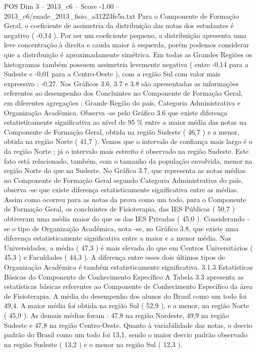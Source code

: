 \begin{textsample}{POS Dim 3 – 2013\_c6 – Score -1.00 – 2013\_c6/enade\_2013\_fisio\_a31223fe5a.txt}
Para o Componente de Formação Geral, o coeficiente de assimetria da distribuição das notas dos estudantes é negativo ( -0,14 ).
Por ser um coeficiente pequeno, a distribuição apresenta uma leve concentração à direita e cauda maior à esquerda, porém podemos considerar que a distribuição é aproximadamente simétrica.
Em todas as Grandes Regiões os histogramas também possuem assimetria levemente negativa ( entre -0,14 para a Sudeste e -0,01 para a Centro-Oeste ), com a região Sul com valor mais expressivo : -0,27.
Nos Gráficos 3.6, 3.7 e 3.8 são apresentadas as informações referentes ao desempenho dos Concluintes no Componente de Formação Geral, em diferentes agregações : Grande Região do país, Categoria Administrativa e Organização Acadêmica.
Observa -se pelo Gráfico 3.6 que existe diferença estatisticamente significativa ao nível de 95 \% entre a maior média das notas na Componente de Formação Geral, obtida na região Sudeste ( 46,7 ) e a menor, obtida na região Norte ( 41,7 ).
Vemos que o intervalo de confiança mais largo é o da região Norte ; já o intervalo mais estreito é observado na região Sudeste.
Este fato está relacionado, também, com o tamanho da população envolvida, menor na região Norte do que na Sudeste.
No Gráfico 3.7, que representa as notas médias no Componente de Formação Geral segundo Categoria Administrativa do país, observa -se que existe diferença estatisticamente significativa entre as médias.
Assim como ocorreu para as notas da prova como um todo, para o Componente de Formação Geral, os concluintes de Fisioterapia, das IES Públicas ( 50,7 ) obtiveram uma média maior do que os das IES Privadas ( 45,0 ).
Considerando -se o tipo de Organização Acadêmica, nota -se, no Gráfico 3.8, que existe uma diferença estatisticamente significativa entre a maior e a menor média.
Nas Universidades, a média ( 47,3 ) é mais elevada do que em Centros Universitários ( 45,3 ) e Faculdades ( 44,3 ).
A diferença entre esses dois últimos tipos de Organização Acadêmica é também estatisticamente significativa. 3.1.3 Estatísticas Básicas do Componente de Conhecimento Específico A Tabela 3.3 apresenta as estatísticas básicas referentes ao Componente de Conhecimento Específico da área de Fisioterapia.
A média do desempenho dos alunos do Brasil como um todo foi 49,4.
A maior média foi obtida na região Sul ( 52,9 ), e a menor, na região Norte ( 45,9 ).
As demais médias foram : 47,8 na região Nordeste, 49,9 na região Sudeste e 47,8 na região Centro-Oeste.
Quanto à variabilidade das notas, o desvio padrão do Brasil como um todo foi 13,1, sendo o maior desvio padrão observado na região Sudeste ( 13,2 ) e o menor na região Sul ( 12,3 ).

\end{textsample}
